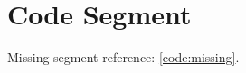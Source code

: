 \documentclass[a4paper,12pt]{report}
\begin{document}
\chapter{Code Segment}
Missing segment reference: \ref{code:missing}.
\end{document}
